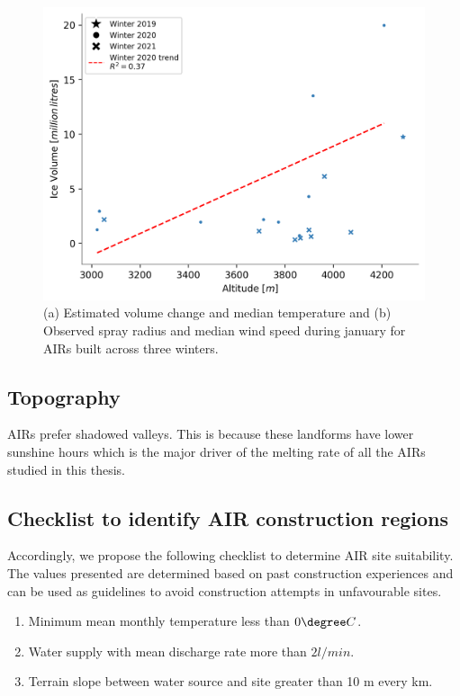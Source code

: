 \begin{figure}[t]
\centering
\includegraphics[width=12cm]{figs/altitudevsvolume.png}
\caption{(a) Estimated volume change and median temperature and (b) Observed spray radius and median wind speed
during january for AIRs built across three winters. }
\label{fig:altitudevsvolume}
\end{figure}



\subsection{Topography}

AIRs prefer shadowed valleys. This is because these landforms have lower sunshine hours which is the major
driver of the melting rate of all the AIRs studied in this thesis.

\subsection{Checklist to identify AIR construction regions}

Accordingly, we propose the following checklist to determine AIR site suitability. The values presented are
determined based on past construction experiences and can be used as guidelines to avoid construction attempts
in unfavourable sites.

\begin{enumerate}

  \item Minimum mean monthly temperature less than $0 \degree C$. 
  \item Water supply with mean discharge rate more than $2 l/min$. 
  \item Terrain slope between water source and site greater than 10 m every km. 

\end{enumerate}

